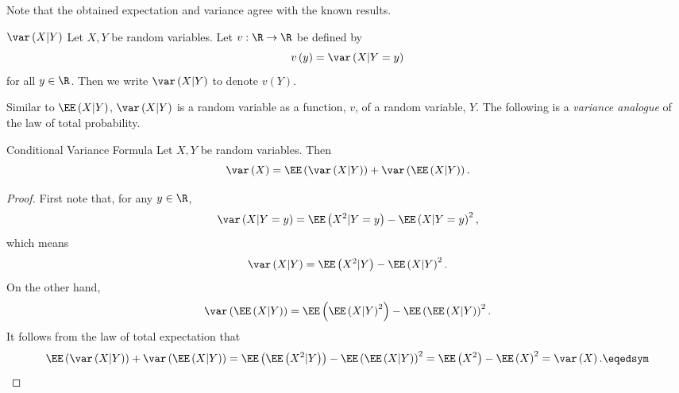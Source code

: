 \documentclass[stat333]{subfiles}
\begin{document}
    \noindent Note that the obtained expectation and variance agree with the known results.

    \begin{notation}{$\var\left( X|Y \right)$}{}
        Let $X,Y$ be random variables. Let $v:\R\to\R$ be defined by
        \begin{equation*}
            v\left( y \right)=\var\left( X|Y=y \right)
        \end{equation*}
        for all $y\in\R$. Then we write $\var\left( X|Y \right)$ to denote $v\left( Y \right)$.
    \end{notation}

    \np Similar to $\EE\left( X|Y \right)$, $\var\left( X|Y \right)$ is a random variable as a function, $v$, of a random variable, $Y$. The following is a \textit{variance analogue} of the law of total probability.

    \begin{theorem}{Conditional Variance Formula}
        Let $X,Y$ be random variables. Then
        \begin{equation*}
            \var\left( X \right)=\EE\left( \var\left( X|Y \right) \right)+\var\left( \EE\left( X|Y \right) \right).
        \end{equation*}
    \end{theorem}

    \begin{proof}
        First note that, for any $y\in\R$,
        \begin{equation*}
            \var\left( X|Y=y \right)=\EE\left( X^{2}|Y=y \right)-\EE\left( X|Y=y \right)^{2},
        \end{equation*}
        which means
        \begin{equation*}
            \var\left( X|Y \right)=\EE\left( X^{2}|Y \right)-\EE\left( X|Y \right)^{2}.
        \end{equation*}
        On the other hand,
        \begin{equation*}
            \var\left( \EE\left( X|Y \right) \right) = \EE\left( \EE\left( X|Y \right)^{2} \right)-\EE\left( \EE\left( X|Y \right) \right)^{2}.
        \end{equation*}
        It follows from the law of total expectation that
        \begin{equation*}
            \EE\left( \var\left( X|Y \right) \right)+\var\left( \EE\left( X|Y \right) \right) = \EE\left( \EE\left( X^{2}|Y \right) \right)-\EE\left( \EE\left( X|Y \right) \right)^{2}=\EE\left( X^{2} \right)-\EE\left( X \right)^{2}=\var\left( X \right).\eqedsym
        \end{equation*}
    \end{proof}
\end{document}

